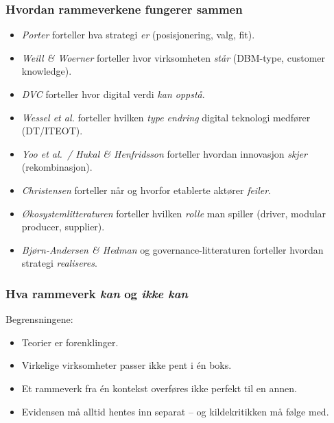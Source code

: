 
\subsubsection*{Hvordan rammeverkene fungerer sammen}
\begin{itemize}
  \item \emph{Porter} forteller hva strategi \emph{er} (posisjonering, valg,
    fit).
  \item \emph{Weill \& Woerner} forteller hvor virksomheten \emph{står}
    (DBM-type, customer knowledge).
  \item \emph{DVC} forteller hvor digital verdi \emph{kan oppstå}.
  \item \emph{Wessel et al.} forteller hvilken \emph{type endring} digital
    teknologi medfører (DT/ITEOT).
  \item \emph{Yoo et al.\ / Hukal \& Henfridsson} forteller hvordan
    innovasjon \emph{skjer} (rekombinasjon).
  \item \emph{Christensen} forteller når og hvorfor etablerte aktører
    \emph{feiler}.
  \item \emph{Økosystemlitteraturen} forteller hvilken \emph{rolle} man
    spiller (driver, modular producer, supplier).
  \item \emph{Bjørn-Andersen \& Hedman} og governance-litteraturen forteller
    hvordan strategi \emph{realiseres}.
\end{itemize}

\subsubsection*{Hva rammeverk \emph{kan} og \emph{ikke kan}}
Begrensningene:
\begin{itemize}
  \item Teorier er forenklinger.
  \item Virkelige virksomheter passer ikke pent i én boks.
  \item Et rammeverk fra én kontekst overføres ikke perfekt til en annen.
  \item Evidensen må alltid hentes inn separat -- og kildekritikken må
    følge med.
\end{itemize}

